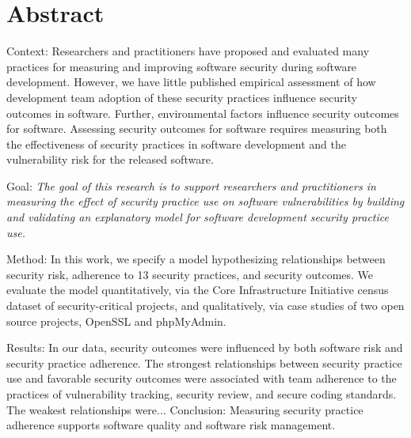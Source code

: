 \section{Abstract}
\label{sec:abstract}
Context: Researchers and practitioners have proposed and evaluated many practices for measuring and improving software security during software development. However, we have little published empirical assessment of how development team adoption of these security practices influence security outcomes in software. Further, environmental factors influence security outcomes for software. Assessing security outcomes for software requires measuring both the effectiveness of security practices in software development and the vulnerability risk for the released software.

Goal:  \textit{The goal of this research is to support researchers and practitioners in measuring the effect of security practice use on software vulnerabilities by building and validating an explanatory model for software development security practice use.} 

Method: In this work, we specify a model hypothesizing relationships between security risk, adherence to 13 security practices, and security outcomes.  We evaluate the model quantitatively, via the Core Infrastructure Initiative census dataset of security-critical projects, and qualitatively, via case studies of two open source projects, OpenSSL and phpMyAdmin. 

Results: In our data, security outcomes were influenced by both software risk and security practice adherence. The strongest relationships between security practice use and favorable security outcomes were associated with team adherence to the practices of vulnerability tracking, security review, and secure coding standards. The weakest relationships were... Conclusion: Measuring security practice adherence supports software quality and software risk management.
